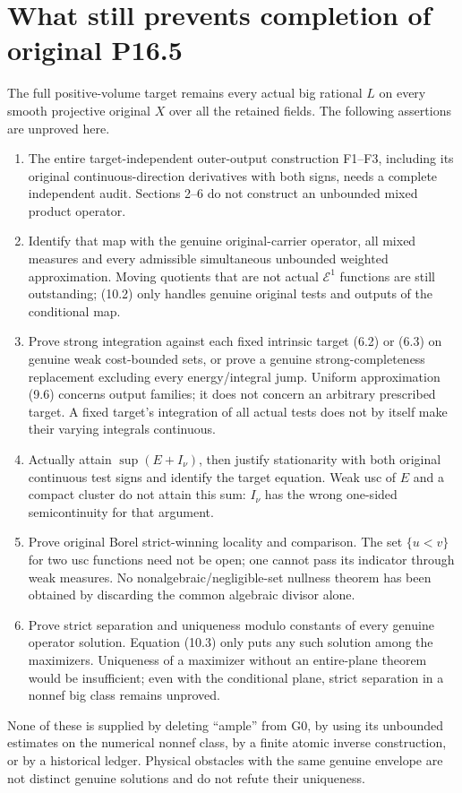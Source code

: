 \documentclass[10pt]{article}
\newcommand{\E}{\mathcal E}
\begin{document}
\section{What still prevents completion of original P16.5}
The full positive-volume target remains every actual big rational $L$
on every smooth projective original $X$ over all the retained fields.
The following assertions are unproved here.
\begin{enumerate}
\item The entire target-independent outer-output construction F1--F3,
including its original continuous-direction derivatives with both signs,
needs a complete independent
audit. Sections 2--6 do not construct an unbounded mixed product operator.
\item Identify that map with the genuine original-carrier operator,
all mixed measures and every admissible simultaneous unbounded weighted
approximation. Moving quotients that are not actual $\E^1$ functions
are still outstanding; (10.2) only handles genuine original tests and
outputs of the conditional map.
\item Prove strong integration against each fixed intrinsic target
(6.2) or (6.3) on genuine weak cost-bounded sets, or prove a genuine
strong-completeness replacement excluding every energy/integral jump.
Uniform approximation (9.6) concerns output families; it does not concern
an arbitrary prescribed target. A fixed target's integration of all
actual tests does not by itself make their varying integrals continuous.
\item Actually attain $\sup(E+I_\nu)$, then justify stationarity with
both original continuous test signs and identify the target equation.
Weak usc of $E$ and a compact cluster do not attain this sum: $I_\nu$
has the wrong one-sided semicontinuity for that argument.
\item Prove original Borel strict-winning locality and comparison.
The set $\{u<v\}$ for two usc functions need not be open; one cannot
pass its indicator through weak measures. No nonalgebraic/negligible-set
nullness theorem has been obtained by discarding the common algebraic
divisor alone.
\item Prove strict separation and uniqueness modulo constants of
every genuine operator solution. Equation (10.3) only puts any such
solution among the maximizers. Uniqueness of a maximizer without an
entire-plane theorem would be insufficient; even with the conditional
plane, strict separation in a nonnef big class remains unproved.
\end{enumerate}
None of these is supplied by deleting ``ample'' from G0, by using
its unbounded estimates on the numerical nonnef class, by a finite
atomic inverse construction, or by a historical ledger. Physical
obstacles with the same genuine envelope are not distinct genuine
solutions and do not refute their uniqueness.
\end{document}
